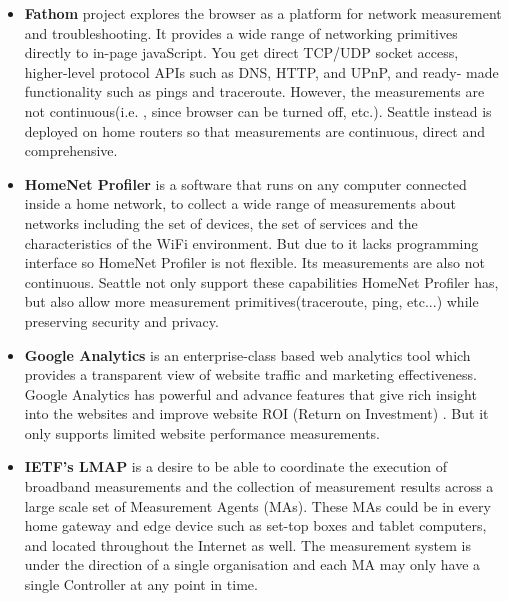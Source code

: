 \begin{itemize}
\item \textbf{Fathom} project explores the browser as a platform for network 
measurement and troubleshooting. It provides a wide range of networking 
primitives directly to in-page javaScript. You get direct TCP/UDP socket 
access, higher-level protocol APIs such as DNS, HTTP, and UPnP, and ready-
made functionality such as pings and traceroute. However, the measurements 
are not continuous(i.e. , since browser can be turned off, etc.). Seattle 
instead is deployed on home routers so that measurements are continuous, 
direct and comprehensive.
\item \textbf{HomeNet Profiler} is a software that runs on any computer 
connected inside a home network, to collect a wide range of measurements 
about networks including the set of devices, the set of services and the 
characteristics of the WiFi environment. But due to it lacks programming 
interface so HomeNet Profiler is not flexible. Its measurements are also not 
continuous. Seattle not only support these capabilities HomeNet Profiler 
has, but also allow more measurement primitives(traceroute, ping, etc...) 
while preserving security and privacy.
\item \textbf{Google Analytics} is an enterprise-class based web analytics 
tool which provides a transparent view of website traffic and marketing 
effectiveness. Google Analytics has powerful and advance features that give 
rich insight into the websites and improve website ROI (Return on Investment)
. But it only supports limited website performance measurements.
\item \textbf{IETF's LMAP} is a desire to be able to coordinate the 
execution of broadband measurements and the collection of measurement 
results across a large scale set of Measurement Agents (MAs). These MAs 
could be in every home gateway and edge device such as set-top boxes and 
tablet computers, and located throughout the Internet as well. The 
measurement system is under the direction of a single organisation and each 
MA may only have a single Controller at any point in time.
\end{itemize}
